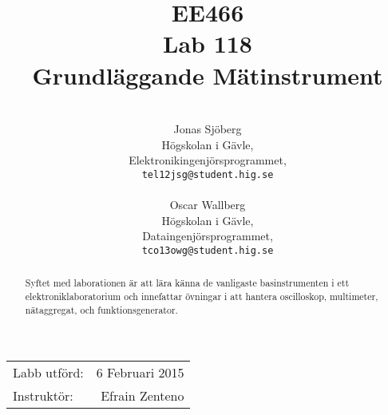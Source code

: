 \documentclass[11pt,a4paper]{article}
\title{EE466 \\ Lab 118 \\ Grundläggande Mätinstrument}
\author{\\
  Jonas Sjöberg\\
  Högskolan i Gävle,\\
  Elektronikingenjörsprogrammet,\\
  \texttt{tel12jsg@student.hig.se}\\
  \\
  Oscar Wallberg\\
  Högskolan i Gävle,\\
  Dataingenjörsprogrammet,\\
  \texttt{tco13owg@student.hig.se}\\}
\date{}
\begin{document}
\maketitle

\begin{center}
    \begin{tabular}{l r}
        Labb utförd: & 6 Februari 2015 \\
        Instruktör: & Efrain Zenteno
    \end{tabular}
\end{center}

\begin{abstract}
    Syftet med laborationen är att lära känna de vanligaste basinstrumenten i
    ett elektroniklaboratorium och innefattar övningar i att hantera
    oscilloskop, multimeter, nätaggregat, och funktionsgenerator.
\end{abstract}

\newpage

{
    \setcounter{tocdepth}{3}
    \tableofcontents
}

\newpage

\end{document}
